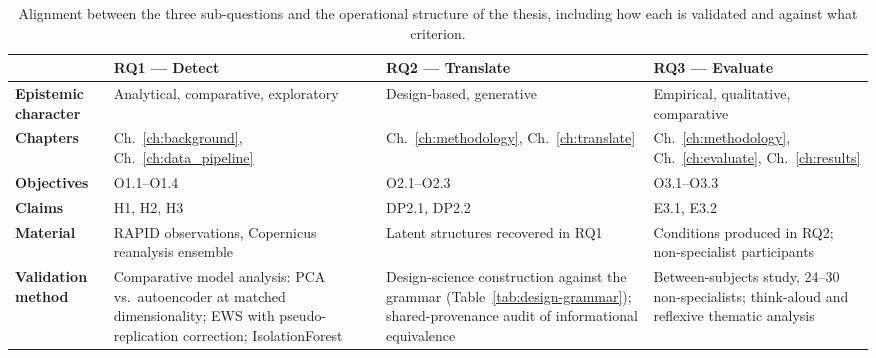 \begin{table}[!ht]
    \centering
    \small
    \setlength{\tabcolsep}{5pt}
    \renewcommand{\arraystretch}{1.25}
    \caption{Alignment between the three sub-questions and the operational structure of the thesis, including how each is validated and against what criterion.}
    \label{tab:alignment}

    \begin{tabular}{
        @{}
        >{\RaggedRight\arraybackslash}p{2.7cm}
        >{\RaggedRight\arraybackslash}p{3.7cm}
        >{\RaggedRight\arraybackslash}p{3.7cm}
        >{\RaggedRight\arraybackslash}p{3.7cm}
        @{}
    }
        \toprule

        & \textbf{RQ1 --- Detect} 
        & \textbf{RQ2 --- Translate} 
        & \textbf{RQ3 --- Evaluate} \\

        \midrule

        \textbf{Epistemic character}
            & Analytical, comparative, exploratory
            & Design-based, generative
            & Empirical, qualitative, comparative \\[0.5em]

        \textbf{Chapters}
            & Ch.~\ref{ch:background}, Ch.~\ref{ch:data_pipeline}
            & Ch.~\ref{ch:methodology}, Ch.~\ref{ch:translate}
            & Ch.~\ref{ch:methodology}, Ch.~\ref{ch:evaluate}, Ch.~\ref{ch:results} \\[0.5em]

        \textbf{Objectives}
            & O1.1--O1.4
            & O2.1--O2.3
            & O3.1--O3.3 \\[0.5em]

        \textbf{Claims}
            & H1, H2, H3
            & DP2.1, DP2.2
            & E3.1, E3.2 \\[0.5em]

        \textbf{Material}
            & RAPID observations, Copernicus reanalysis ensemble
            & Latent structures recovered in RQ1
            & Conditions produced in RQ2; non-specialist participants \\[0.5em]

        \textbf{Validation method}
            & Comparative model analysis: PCA vs.\ autoencoder at matched dimensionality; EWS with pseudo-replication correction; IsolationForest
            & Design-science construction against the grammar (Table~\ref{tab:design-grammar}); shared-provenance audit of informational equivalence
            & Between-subjects study, 24--30 non-specialists; think-aloud and reflexive thematic analysis \\[0.5em]


\end{tabular}
\end{table}
